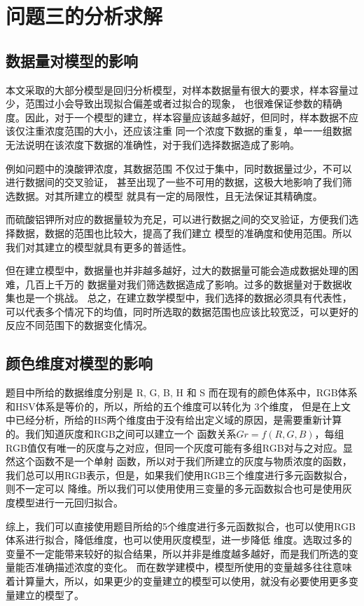 \section{问题三的分析求解}
\subsection{数据量对模型的影响}
   本文采取的大部分模型是回归分析模型，对样本数据量有很大的要求，样本容量过少，范围过小会导致出现拟合偏差或者过拟合的现象，
   也很难保证参数的精确度。因此，对于一个模型的建立，样本容量应该越多越好，但同时，样本数据不应该仅注重浓度范围的大小，还应该注重
   同一个浓度下数据的重复，单一一组数据无法说明在该浓度下数据的准确性，对于我们选择数据造成了影响。
   
   例如问题中的溴酸钾浓度，其数据范围 不仅过于集中，同时数据量过少，不可以进行数据间的交叉验证，
   甚至出现了一些不可用的数据，这极大地影响了我们筛选数据。对其所建立的模型 就具有一定的局限性，且无法保证其精确度。

   而硫酸铝钾所对应的数据量较为充足，可以进行数据之间的交叉验证，方便我们选择数据，数据的范围也比较大，提高了我们建立
   模型的准确度和使用范围。所以我们对其建立的模型就具有更多的普适性。
   
   但在建立模型中，数据量也并非越多越好，过大的数据量可能会造成数据处理的困难，几百上千万的
   数据量对我们筛选数据造成了影响。过多的数据量对于数据收集也是一个挑战。
   总之，在建立数学模型中，我们选择的数据必须具有代表性，可以代表多个情况下的均值，同时所选取的数据范围也应该比较宽泛，可以更好的
   反应不同范围下的数据变化情况。

\subsection{颜色维度对模型的影响}
    题目中所给的数据维度分别是 R, G, B, H 和 S 而在现有的颜色体系中，RGB体系和HSV体系是等价的，所以，所给的五个维度可以转化为
    3个维度， 但是在上文中已经分析，所给的HS两个维度由于没有给出定义域的原因，是需要重新计算的。我们知道灰度和RGB之间可以建立一个
    函数关系$Gr = f(R, G, B)$，每组RGB值仅有唯一的灰度与之对应，但同一个灰度可能有多组RGB对与之对应。显然这个函数不是一个单射
    函数，所以对于我们所建立的灰度与物质浓度的函数，我们总可以用RGB表示，但是，如果我们使用RGB三个维度进行多元函数拟合，则不一定可以
    降维。所以我们可以使用使用三变量的多元函数拟合也可是使用灰度模型进行一元回归拟合。
    
    综上，我们可以直接使用题目所给的5个维度进行多元函数拟合，也可以使用RGB体系进行拟合，降低维度，也可以使用灰度模型，进一步降低
    维度。选取过多的变量不一定能带来较好的拟合结果，所以并非是维度越多越好，而是我们所选的变量能否准确描述浓度的变化。
    而在数学建模中，模型所使用的变量越多往往意味着计算量大，所以，如果更少的变量建立的模型可以使用，就没有必要使用更多变量建立的模型了。